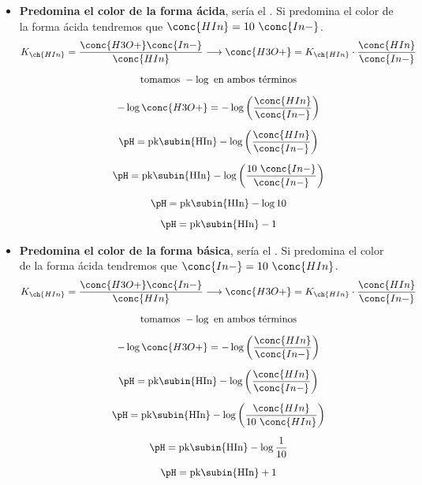     \begin{itemize}
        \item \textbf{Predomina el color de la forma ácida}, sería el . Si predomina el color de la forma ácida tendremos que \( \conc{HIn} = 10\ \conc{In-}  \).
        \begin{gather}
            K_{\ch{HIn}} = \dfrac{\conc{H3O+}\conc{In-}}{\conc{HIn}} \longrightarrow \conc{H3O+} = K_{\ch{HIn}} \cdot \dfrac{\conc{HIn}}{\conc{In-}} \notag \\[2mm]
            \text{tomamos } -\log \text{ en ambos términos}\notag \\[2mm]
            -\log{\conc{H3O+}} = -\log{\left( \dfrac{\conc{HIn}}{\conc{In-}} \right)} \notag \\[2mm]
            \pH = \text{pk\subin{HIn}}  -\log{\left( \dfrac{\conc{HIn}}{\conc{In-}} \right)} \notag \\[2mm]
             \pH = \text{pk\subin{HIn}}  -\log{\left( \dfrac{10\ \conc{In-}}{\conc{In-}} \right)} \notag \\[2mm]
            \pH = \text{pk\subin{HIn}}  -\log{10} \notag \\[2mm]
            \pH = \text{pk\subin{HIn}}  - 1 \label{eq:intervalo_ph_resta_1}
        \end{gather}
        \item \textbf{Predomina el color de la forma básica}, sería el .
        Si predomina el color de la forma ácida tendremos que \( \conc{In-} = 10\ \conc{HIn}  \).
        \begin{gather}
            K_{\ch{HIn}} = \dfrac{\conc{H3O+}\conc{In-}}{\conc{HIn}} \longrightarrow \conc{H3O+} = K_{\ch{HIn}} \cdot \dfrac{\conc{HIn}}{\conc{In-}} \notag \\[2mm]
            \text{tomamos } -\log \text{ en ambos términos}\notag \\[2mm]
            -\log{\conc{H3O+}} = -\log{\left( \dfrac{\conc{HIn}}{\conc{In-}} \right)} \notag \\[2mm]
            \pH = \text{pk\subin{HIn}}  -\log{\left( \dfrac{\conc{HIn}}{\conc{In-}} \right)} \notag \\[2mm]
             \pH = \text{pk\subin{HIn}}  -\log{\left( \dfrac{\conc{HIn}}{10\ \conc{HIn}} \right)} \notag \\[2mm]
            \pH = \text{pk\subin{HIn}}  -\log{\dfrac{1}{10}} \notag \\[2mm]
            \pH = \text{pk\subin{HIn}}  + 1 \label{eq:intervalo_ph_suma_1}
        \end{gather}
    \end{itemize}

